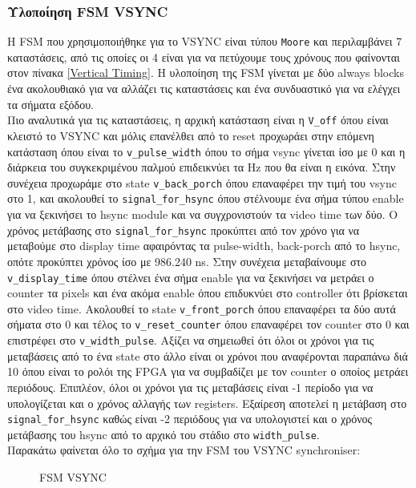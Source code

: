 \documentclass[12pt,a4paper]{article}
\begin{document}
	\subsubsection{Υλοποίηση FSM VSYNC}
	Η FSM που χρησιμοποιήθηκε για το VSYNC είναι τύπου \verb*|Moore| και περιλαμβάνει 7 καταστάσεις, από τις οποίες οι 4 είναι για να πετύχουμε τους χρόνους που φαίνονται στον πίνακα \ref{Vertical Timing}. Η υλοποίηση της FSM γίνεται με δύο always blocks ένα ακολουθιακό για να αλλάζει τις καταστάσεις και ένα συνδυαστικό για να ελέγχει τα σήματα εξόδου.\\
	Πιο αναλυτικά για τις καταστάσεις, η αρχική κατάσταση είναι η \verb*|V_off| όπου είναι κλειστό το VSYNC και μόλις επανέλθει από το reset προχωράει στην επόμενη κατάσταση όπου είναι το \verb*|v_pulse_width| όπου το σήμα vsync γίνεται ίσο με 0 και η διάρκεια του συγκεκριμένου παλμού επιδεικνύει τα Hz που θα είναι η εικόνα. Στην συνέχεια προχωράμε στο state \verb*|v_back_porch| όπου επαναφέρει την τιμή του vsync στο 1, και ακολουθεί το \verb*|signal_for_hsync| όπου στέλνουμε ένα σήμα τύπου enable για να ξεκινήσει το hsync module και να συγχρονιστούν τα video time των δύο. Ο χρόνος μετάβασης στο \verb*|signal_for_hsync| προκύπτει από τον χρόνο για να μεταβούμε στο display time αφαιρόντας τα pulse-width, back-porch από το hsync, οπότε προκύπτει χρόνος ίσο με 986.240 ns. Στην συνέχεια μεταβαίνουμε στο \verb*|v_display_time| όπου στέλνει ένα σήμα enable για να ξεκινήσει να μετράει ο counter τα pixels και ένα ακόμα enable όπου επιδυκνύει στο controller ότι βρίσκεται στο video time. Ακολουθεί το state \verb*|v_front_porch| όπου επαναφέρει τα δύο αυτά σήματα στο 0 και τέλος το \verb*|v_reset_counter| όπου επαναφέρει τον counter στο 0 και επιστρέφει στο \verb*|v_width_pulse|.
	Αξίζει να σημειωθεί ότι όλοι οι χρόνοι για τις μεταβάσεις από το ένα state στο άλλο είναι οι χρόνοι που αναφέρονται παραπάνω διά 10 όπου είναι το ρολόι της FPGA για να συμβαδίζει με τον counter ο οποίος μετράει περιόδους. Επιπλέον, όλοι οι χρόνοι για τις μεταβάσεις είναι -1 περίοδο για να υπολογίζεται και ο χρόνος αλλαγής των registers. Εξαίρεση αποτελεί η μετάβαση στο \verb*|signal_for_hsync| καθώς είναι -2 περιόδους για να υπολογιστεί και ο χρόνος μετάβασης του hsync από το αρχικό του στάδιο στο \verb*|width_pulse|.\\
	Παρακάτω φαίνεται όλο το σχήμα για την FSM του VSYNC synchroniser:
	\begin{figure} [H]
		\caption{FSM VSYNC}
		\label{FSM VSYNC}
	\end{figure}
	
\end{document}
